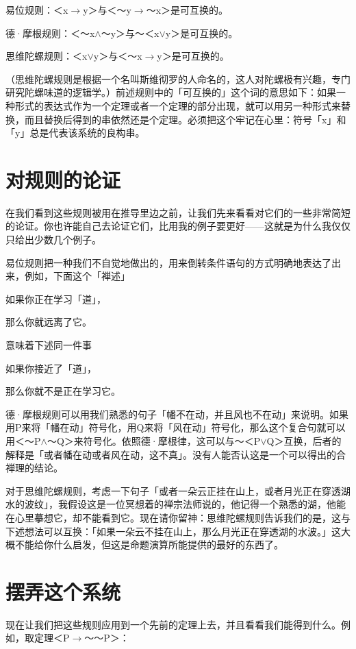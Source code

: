 \documentclass[
  12pt,
  twoside,
  openright,
  oldfontcommands,
]{memoir}
\begin{document}
易位规则：＜x$\rightarrow$y＞与＜～y$\rightarrow$～x＞是可互换的。

德·摩根规则：＜～x$\wedge$～y＞与～＜x$\vee$y＞是可互换的。

思维陀螺规则：＜x$\vee$y＞与＜～x$\rightarrow$y＞是可互换的。

（思维陀螺规则是根据一个名叫斯维彻罗的人命名的，这人对陀螺极有兴趣，专门研究陀螺味道的逻辑学。）前述规则中的「可互换的」这个词的意思如下：如果一种形式的表达式作为一个定理或者一个定理的部分出现，就可以用另一种形式来替换，而且替换后得到的串依然还是个定理。必须把这个牢记在心里：符号「x」和「y」总是代表该系统的良构串。

\section{对规则的论证}

在我们看到这些规则被用在推导里边之前，让我们先来看看对它们的一些非常简短的论证。你也许能自己去论证它们，比用我的例子要更好------这就是为什么我仅仅只给出少数几个例子。

易位规则把一种我们不自觉地做出的，用来倒转条件语句的方式明确地表达了出来，例如，下面这个「禅述」

如果你正在学习「道」，

那么你就远离了它。

意味着下述同一件事

如果你接近了「道」，

那么你就不是正在学习它。

德·摩根规则可以用我们熟悉的句子「幡不在动，并且风也不在动」来说明。如果用P来将「幡在动」符号化，用Q来将「风在动」符号化，那么这个复合句就可以用＜～P$\wedge$～Q＞来符号化。依照德·摩根律，这可以与～＜P$\vee$Q＞互换，后者的解释是「或者幡在动或者风在动，这不真」。没有人能否认这是一个可以得出的合禅理的结论。

对于思维陀螺规则，考虑一下句子「或者一朵云正挂在山上，或者月光正在穿透湖水的波纹」，我假设这是一位冥想着的禅宗法师说的，他记得一个熟悉的湖，他能在心里摹想它，却不能看到它。现在请你留神：思维陀螺规则告诉我们的是，这与下述想法可以互换：「如果一朵云不挂在山上，那么月光正在穿透湖的水波。」这大概不能给你什么启发，但这是命题演算所能提供的最好的东西了。

\section{摆弄这个系统}

现在让我们把这些规则应用到一个先前的定理上去，并且看看我们能得到什么。例如，取定理＜P$\rightarrow$～～P＞：
\end{document}
